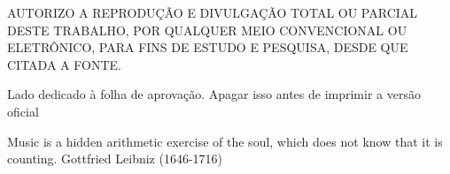 \capa


\folhaderosto
% 
\pretextualchapter{}
	\thispagestyle{plain}
	\noindent \parbox{5.7in}{\centering AUTORIZO A REPRODUÇÃO E DIVULGAÇÃO TOTAL OU PARCIAL DESTE TRABALHO, POR QUALQUER MEIO CONVENCIONAL OU ELETRÔNICO, PARA FINS DE ESTUDO E PESQUISA, DESDE QUE CITADA A FONTE.}

\pretextualchapter{}
	Lado dedicado à folha de aprovação. Apagar isso antes de imprimir a versão oficial



\pretextualchapter{}

	\begin{epigrafetop}
		{Music is a hidden arithmetic exercise of the soul, which does not know that it is counting.}
        {Gottfried Leibniz (1646-1716)}
	\end{epigrafetop}



